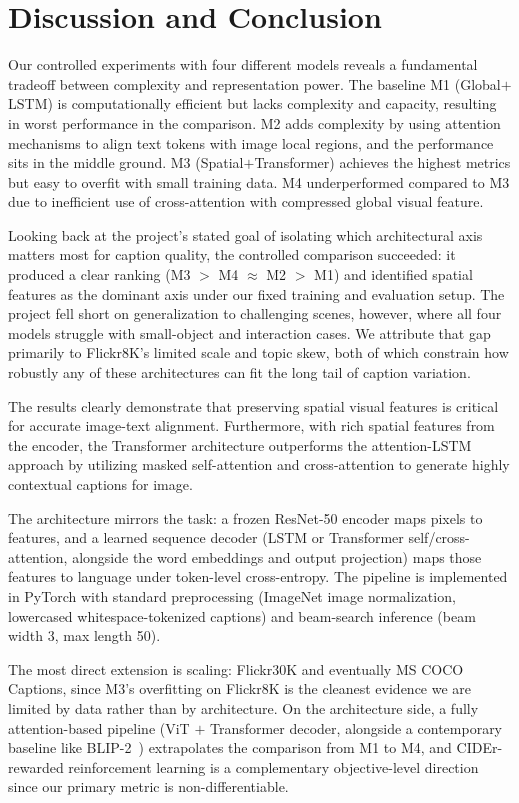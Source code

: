 \documentclass[10pt,twocolumn,letterpaper]{article}
\begin{document}
\section{Discussion and Conclusion}

Our controlled experiments with four different models reveals a
fundamental tradeoff between complexity and representation power.
The baseline M1 (Global$+$LSTM) is computationally efficient but
lacks complexity and capacity, resulting in worst performance in the
comparison. M2 adds complexity by using attention mechanisms to
align text tokens with image local regions, and the performance sits
in the middle ground. M3 (Spatial$+$Transformer) achieves the
highest metrics but easy to overfit with small training data. M4
underperformed compared to M3 due to inefficient use of
cross-attention with compressed global visual feature.

Looking back at the project's stated goal of isolating which
architectural axis matters most for caption quality, the controlled
comparison succeeded: it produced a clear ranking
(M3 $>$ M4 $\approx$ M2 $>$ M1) and identified spatial features as
the dominant axis under our fixed training and evaluation setup.
The project fell short on generalization to challenging scenes,
however, where all four models struggle with small-object and
interaction cases. We attribute that gap primarily to Flickr8K's
limited scale and topic skew, both of which constrain how robustly
any of these architectures can fit the long tail of caption
variation.

The results clearly demonstrate that preserving spatial visual
features is critical for accurate image-text alignment. Furthermore,
with rich spatial features from the encoder, the Transformer
architecture outperforms the attention-LSTM approach by utilizing
masked self-attention and cross-attention to generate highly
contextual captions for image.

The architecture mirrors the task: a frozen ResNet-50 encoder maps
pixels to features, and a learned sequence decoder (LSTM or
Transformer self/cross-attention, alongside the word embeddings and
output projection) maps those features to language under token-level
cross-entropy. The pipeline is implemented in PyTorch with standard
preprocessing (ImageNet image normalization, lowercased
whitespace-tokenized captions) and beam-search inference (beam
width 3, max length 50).

The most direct extension is scaling: Flickr30K and eventually MS
COCO Captions, since M3's overfitting on Flickr8K is the cleanest
evidence we are limited by data rather than by architecture. On the
architecture side, a fully attention-based pipeline (ViT $+$
Transformer decoder, alongside a contemporary baseline like
BLIP-2~\cite{li2023blip2}) extrapolates the comparison from M1 to
M4, and CIDEr-rewarded reinforcement learning is a complementary
objective-level direction since our primary metric is
non-differentiable.
\end{document}

